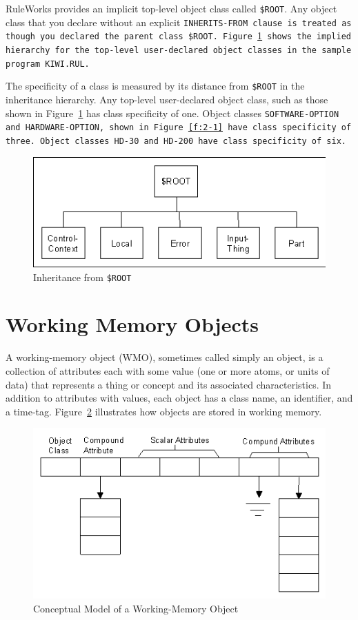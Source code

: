RuleWorks provides an implicit top-level object class called
\verb|$ROOT|. Any object class that you declare without an explicit
\tt{INHERITS-FROM} clause is treated as though you declared the parent
class \verb|$ROOT|. Figure~\ref{f:2-2} shows the implied hierarchy for
the top-level user-declared object classes in the sample program
\tt{KIWI.RUL}.

The specificity of a class is measured by its distance from
\verb|$ROOT| in the inheritance hierarchy. Any top-level user-declared
object class, such as those shown in Figure~\ref{f:2-2} has class specificity
of one. Object classes \tt{SOFTWARE-OPTION} and \tt{HARDWARE-OPTION},
shown in Figure~\ref{f:2-1} have class specificity of three. Object
classes \tt{HD-30} and \tt{HD-200} have class specificity of six.

\begin{figure}[h]
  \centering
  \includegraphics[scale=0.7]{f2-2}
  \caption{Inheritance from \tt{\$ROOT}}
  \label{f:2-2}
\end{figure}

\section{Working Memory Objects}

A working-memory object (WMO), sometimes called simply an
object, is a collection of attributes each with some value
(one or more atoms, or units of data) that represents a thing
or concept and its associated characteristics. In addition to
attributes with values, each object has a class name, an
identifier, and a time-tag. Figure~\ref{f:2-3} illustrates how
objects are stored in working memory.

\begin{figure}[h]
  \centering
  \includegraphics[scale=0.7]{f2-3}
  \caption{Conceptual Model of a Working-Memory Object}
  \label{f:2-3}
\end{figure}

